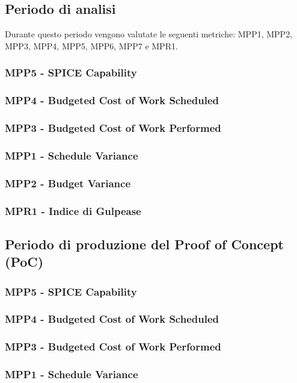 \subsection{Periodo di analisi}
Durante questo periodo vengono valutate le seguenti metriche: MPP1, MPP2, MPP3, MPP4, MPP5, MPP6, MPP7 e MPR1.
\subsubsection{MPP5 - SPICE Capability}
\subsubsection{MPP4 - Budgeted Cost of Work Scheduled}
\subsubsection{MPP3 - Budgeted Cost of Work Performed}
\subsubsection{MPP1 - Schedule Variance}
\subsubsection{MPP2 - Budget Variance}
\subsubsection{MPR1 - Indice di Gulpease}

\subsection{Periodo di produzione del Proof of Concept (PoC)}
\subsubsection{MPP5 - SPICE Capability}
\subsubsection{MPP4 - Budgeted Cost of Work Scheduled}
\subsubsection{MPP3 - Budgeted Cost of Work Performed}
\subsubsection{MPP1 - Schedule Variance}

